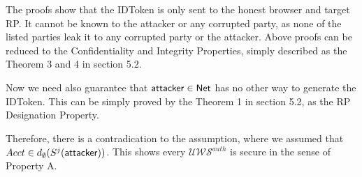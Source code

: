 \documentclass[letterpaper,onecolumn,10pt]{article}
\newtheorem{lemma}{Lemma}
\begin{document}
The proofs show that the IDToken is only sent to the honest browser and target RP.
It cannot be known to the attacker or any corrupted party, as none of the listed 
parties leak it to any corrupted party or the attacker. 
Above proofs can be reduced to the {\color{blue}Confidentiality and Integrity 
Properties}, simply described as the {\color{blue} Theorem 3 and 4} in section 5.2.

Now we need also guarantee that $\mathsf{attacker} \in \mathsf{Net}$ has no other way
to generate the IDToken. This can be simply proved by the {\color{blue} Theorem 1} 
in section 5.2, as the {\color{blue} RP Designation Property}.



Therefore, there is a contradication to the assumption, where we assumed that 
$Acct \in d_{\emptyset}(S^j(\mathsf{attacker}))$. 
This shows every $\mathcal{U\!W\!S}^{auth}$ is secure in the sense of Property A.
\end{document}
